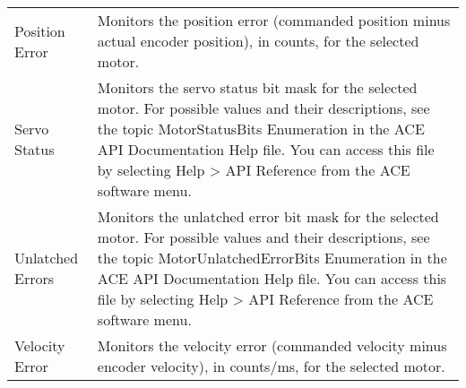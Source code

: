 \begin{longtable}[width=\textwidth]{ p{} | p{}}
\parbox[t]{0.33\textwidth}{Position Error} & Monitors the position error (commanded position minus actual encoder position), in counts, for the selected motor. \\ [2ex]
\parbox[t]{0.33\textwidth}{Servo Status} & Monitors the servo status bit mask for the selected motor. For possible values and their descriptions, see the topic MotorStatusBits Enumeration in the ACE API Documentation Help file. You can access this file by selecting Help > API Reference from the ACE software menu.\\ [2ex]
\parbox[t]{0.33\textwidth}{Unlatched Errors} & Monitors the unlatched error bit mask for the selected motor. For possible values and their descriptions, see the topic MotorUnlatchedErrorBits Enumeration in the ACE API Documentation Help file. You can access this file by selecting Help > API Reference from the ACE software menu. \\ [2ex]
\parbox[t]{0.33\textwidth}{Velocity Error} & Monitors the velocity error (commanded velocity minus encoder velocity), in counts/ms, for the selected motor. \\ [2ex]
\end{longtable}